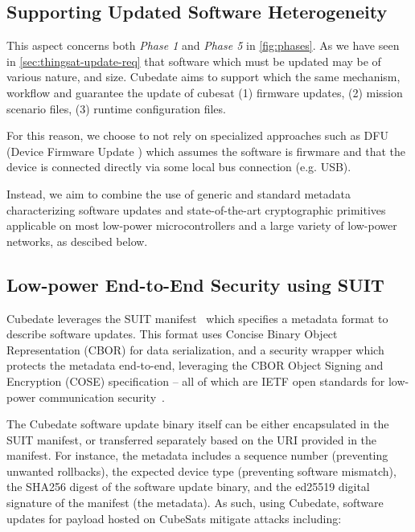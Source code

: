 \subsection{Supporting Updated Software Heterogeneity}
This aspect concerns both \textit{Phase 1} and \textit{Phase 5} in \autoref{fig:phases}. 
As we have seen in \autoref{sec:thingsat-update-req} that software which must be updated may be of various nature, and size.
Cubedate aims to support which the same mechanism, workflow and guarantee the update of cubesat (1) firmware updates, (2) mission scenario files, (3) runtime configuration files.

For this reason, we choose to not rely on specialized approaches such as DFU (Device Firmware Update \cite{beningo2018dfu}) which assumes the software is firwmare and that the device is connected directly via some local bus connection (e.g. USB).

Instead, we aim to combine the use of generic and standard metadata characterizing software updates and state-of-the-art cryptographic primitives applicable on most low-power microcontrollers and a large variety of low-power networks, as descibed below.

\subsection{Low-power End-to-End Security using SUIT}

Cubedate leverages the SUIT manifest~\cite{suit-manifest} which specifies a metadata format to describe software updates. This format uses Concise Binary Object Representation (CBOR) for data serialization, and a security wrapper which protects the metadata end-to-end, leveraging the CBOR Object Signing and Encryption (COSE) specification -- all of which are IETF open standards for low-power communication security~\cite{tschofenig2019cyberphysical}.

The Cubedate software update binary itself can be either encapsulated in the SUIT manifest, or transferred separately based on the URI provided in the manifest.
For instance, the metadata includes a sequence number (preventing unwanted rollbacks), the expected device type (preventing software mismatch), the SHA256 digest of the software update binary, and the ed25519 digital signature of the manifest (the metadata).
As such, using Cubedate, software updates for payload hosted on CubeSats mitigate attacks including:

